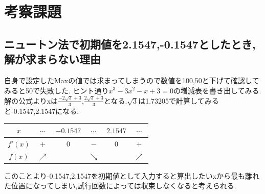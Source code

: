 \documentclass[a4j,10pt,dvipdfmx]{jarticle}
\begin{document}
\section{考察課題}
\subsection{ニュートン法で初期値を2.1547,-0.1547としたとき,解が求まらない理由}
自身で設定したMaxの値では求まってしまうので数値を100,50と下げて確認してみると50で失敗した.
ヒント通り$x^{3} - 3x^{2} - x + 3 = 0$の増減表を書き出してみる.解の公式よりxは$\frac{-2\sqrt{3}+3}{3}$,$\frac{2\sqrt{3}+3}{3}$となる.$\sqrt{3}$は1.73205で計算してみると-0.1547,2.1547になる.

\begin{center}
  \begin{tabular}{|c||ccccc|}
  \hline
  $x$ & $\cdots$ & $-0.1547$ & $\cdots$ & $2.1547$ & $\cdots$ \\
  \hline
  $f'(x)$ & $+$ & $0$ & $-$ & $0$ & $+$ \\
  \hline
  $f(x)$ & $\nearrow$ & & $\searrow$ & & $\nearrow$ \\
  \hline
  \end{tabular}
  \end{center}
このことより-0.1547,2.1547を初期値として入力すると算出したいxから最も離れた位置になってしまい,試行回数によっては収束しなくなると考えられる.
\end{document}
